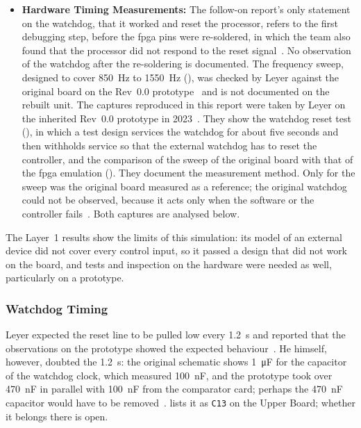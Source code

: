 \begin{itemize}
	\item \textbf{Hardware Timing Measurements:} The follow-on report's only statement on the watchdog, that it worked and reset the processor, refers to the first debugging step, before the \gls{fpga} pins were re-soldered, in which the team also found that the processor did not respond to the reset signal~\cite[p.~13]{savchuk2025}. No observation of the watchdog after the re-soldering is documented. The frequency sweep, designed to cover \SI{850}{\hertz} to \SI{1550}{\hertz} (), was checked by Leyer against the original board on the Rev~0.0 prototype~\cite[Sec.~4.10]{leyer2023} and is not documented on the rebuilt unit. The captures reproduced in this report were taken by Leyer on the inherited Rev~0.0 prototype in 2023~\cite{leyer2023}. They show the watchdog reset test (), in which a test design services the watchdog for about five seconds and then withholds service so that the external watchdog has to reset the controller, and the comparison of the sweep of the original board with that of the \gls{fpga} emulation (). They document the measurement method. Only for the sweep was the original board measured as a reference; the original watchdog could not be observed, because it acts only when the software or the controller fails~\cite[Sec.~4.6]{leyer2023}. Both captures are analysed below.
\end{itemize}

The Layer~1 results show the limits of this simulation: its model of an external device did not cover every control input, so it passed a design that did not work on the board, and tests and inspection on the hardware were needed as well, particularly on a prototype.

\subsubsection{Watchdog Timing}

Leyer expected the reset line to be pulled low every \SI{1.2}{\second} and reported that the observations on the prototype showed the expected behaviour~\cite[Sec.~4.6]{leyer2023}. He himself, however, doubted the \SI{1.2}{\second}: the original schematic shows \SI{1}{\micro\farad} for the capacitor of the watchdog clock, which measured \SI{100}{\nano\farad}, and the prototype took over \SI{470}{\nano\farad} in parallel with \SI{100}{\nano\farad} from the comparator card; perhaps the \SI{470}{\nano\farad} capacitor would have to be removed~\cite[Sec.~4.6]{leyer2023}.  lists it as \texttt{C13} on the Upper Board; whether it belongs there is open.

